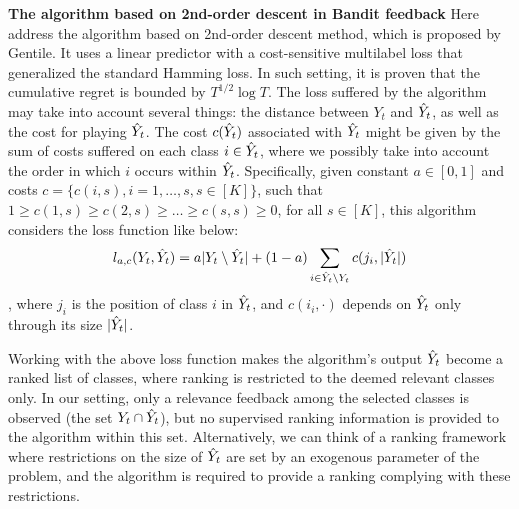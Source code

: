 \vspace{3ex}
\textbf{The algorithm based on 2nd-order descent in Bandit feedback} 
Here address the algorithm based on 2nd-order descent method, which is proposed by Gentile\cite{gentile2014multilabel}. It uses a linear predictor with a cost-sensitive multilabel loss that generalized the standard Hamming loss. In such setting, it is proven that the cumulative regret is bounded by $T^{1/2}\log{T}$. The loss suffered by the algorithm may take into account several things: the distance between $Y_t$ and $\hY$, as well as the cost for playing $\hY$. The cost $c(\hat{Y}_t)$ associated with $\hY$ might be given by the sum of costs suffered on each class $i\in \hat{Y}_t$, where we possibly take into account the order in which $i$ occurs within $\hY$. Specifically, given constant $a\in [0,1]$ and costs $c= \{c(i,s),i = 1,\dots,s, s\in[K]\}$, such that $1\geqslant c(1,s)\geqslant c(2,s)\geqslant\dots\geqslant c(s,s)\geqslant 0$, for all $s\in[K]$, this algorithm considers the loss function like below:
\[l_{a,c}(Y_t,\hat{Y}_t) = a|Y_t\setminus\hat{Y}_t| + (1-a)\sum_{i\in\hat{Y}_t\setminus Y_t}c(j_i,|\hat{Y}_t|)\],
where $j_i$ is the position of class $i$ in $\hY$, and $c(i_i,\cdot)$ depends on $\hY$ only through its size $|\hat{Y}_t|$. 
\iffalse
In the above, the first term accounts for the false negative mistakes, hence there is no specific ordering of labels therein. The second term collects the loss contribution provided by all false positive classes, taking into account through the costs $c(j_i,|\hY|)$ the order in which labels occur in $\hY$. The constant $a$ serves as weighting the relative importance of false positive vs. false negative mistakes. As a specific example, suppose that $K=10$, the cost $c(j,s)$ are given by $c(i,s) = (s-i+1)/s$, $i=1,\dots,s$, the algorithm plays $\hY = (5,2,7)$, but $Y_t$ is $(1,2,8)$. In this case, $|Y_t\setminus\hY| = 2$, and $\sum_{i\in\hY\setminus Y_t}c(j_i,|\hY|) = 3/3 + 1/3$, i.e. the cost for mistakingly playing class $5$ in the top slot of $\hY$ is more damaging than mistaking playing class $7$ in the third slot. In the special case when all costs are unitary, there is no longer need to view $\hY$ as an ordered collection, and the above loss reduces to a standard Hamming-like loss between sets $Y_t$ and $\hY$, i.e. $a|Y_t\setminus \hY|+(1-a)|\hY\setminus Y_t|$. Notice that the bandit feedback $\hY\cap Y_t$ allows the algorithm to know which of the chosen classes in $\hY$ are good or bad. Yet, the loss of $\loss_{a,c}(Y_t,\hY)$ because of hidden part of $Y_t\setminus\hY$. \fi

Working with the above loss function makes the algorithm's output $\hY$ become a ranked list of classes, where ranking is restricted to the deemed relevant classes only. In our setting, only a relevance feedback among the selected classes is observed (the set $Y_t\cap\hat{Y}_t$), but no supervised ranking information is provided to the algorithm within this set. Alternatively, we can think of a ranking framework where restrictions on the size of $\hY$ are set by an exogenous parameter of the problem, and the algorithm is required to provide a ranking complying with these restrictions.


